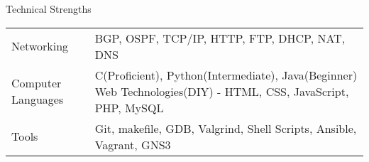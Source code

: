 \documentclass{resume} %
\begin{document}

\begin{rSection}{Technical Strengths}
\begin{tabularx}{\textwidth}{lX}%
Networking & BGP, OSPF, TCP/IP, HTTP, FTP, DHCP, NAT, DNS\\ 
Computer Languages & C(Proficient), Python(Intermediate), Java(Beginner) \newline Web Technologies(DIY) - HTML, CSS, JavaScript, PHP, MySQL\\
Tools & Git, makefile, GDB, Valgrind, Shell Scripts, Ansible, Vagrant, GNS3
\end{tabularx}
\end{rSection}
\end{document}
